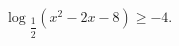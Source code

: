\begin{ex}[type=inequality]
	\begin{condition}
		$ \log$\tiny$_{\dfrac{1}{2}}$\normalsize$(x^2 - 2x - 8)\geqslant-4 .$
	\end{condition}
\end{ex}